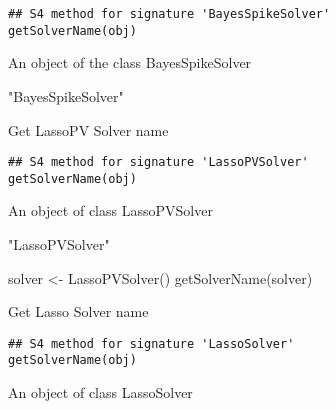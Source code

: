 \documentclass[a4paper]{book}
\begin{document}
%
\begin{Usage}
\begin{verbatim}
## S4 method for signature 'BayesSpikeSolver'
getSolverName(obj)
\end{verbatim}
\end{Usage}
%
\begin{Arguments}
\begin{ldescription}
\item[\code{obj}] An object of the class BayesSpikeSolver
\end{ldescription}
\end{Arguments}
%
\begin{Value}
"BayesSpikeSolver"
\end{Value}
%
\begin{Description}\relax
Get LassoPV Solver name
\end{Description}
%
\begin{Usage}
\begin{verbatim}
## S4 method for signature 'LassoPVSolver'
getSolverName(obj)
\end{verbatim}
\end{Usage}
%
\begin{Arguments}
\begin{ldescription}
\item[\code{obj}] An object of class LassoPVSolver
\end{ldescription}
\end{Arguments}
%
\begin{Value}
"LassoPVSolver"
\end{Value}
%
\begin{Examples}
\begin{ExampleCode}
solver <- LassoPVSolver()
getSolverName(solver)
\end{ExampleCode}
\end{Examples}
%
\begin{Description}\relax
Get Lasso Solver name
\end{Description}
%
\begin{Usage}
\begin{verbatim}
## S4 method for signature 'LassoSolver'
getSolverName(obj)
\end{verbatim}
\end{Usage}
%
\begin{Arguments}
\begin{ldescription}
\item[\code{obj}] An object of class LassoSolver
\end{ldescription}
\end{Arguments}
\end{document}
